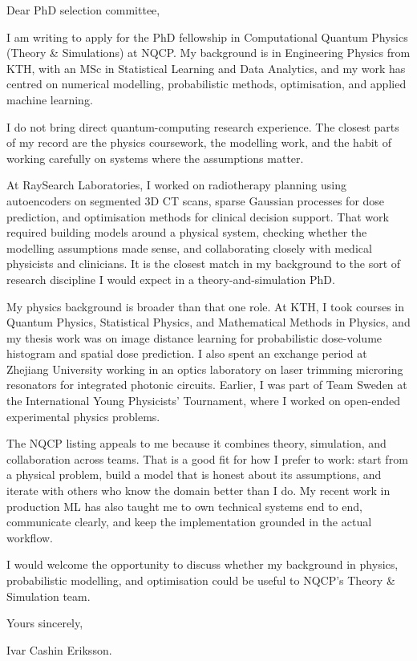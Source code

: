 \documentclass[11pt,a4paper]{moderncv}
\begin{document}
\makecvtitle
Dear PhD selection committee,

\vspace*{2em}
I am writing to apply for the PhD fellowship in Computational Quantum Physics (Theory \& Simulations) at NQCP. My background is in Engineering Physics from KTH, with an MSc in Statistical Learning and Data Analytics, and my work has centred on numerical modelling, probabilistic methods, optimisation, and applied machine learning.

\hspace*{2em}
I do not bring direct quantum-computing research experience. The closest parts of my record are the physics coursework, the modelling work, and the habit of working carefully on systems where the assumptions matter.

\hspace*{2em}
At RaySearch Laboratories, I worked on radiotherapy planning using autoencoders on segmented 3D CT scans, sparse Gaussian processes for dose prediction, and optimisation methods for clinical decision support. That work required building models around a physical system, checking whether the modelling assumptions made sense, and collaborating closely with medical physicists and clinicians. It is the closest match in my background to the sort of research discipline I would expect in a theory-and-simulation PhD.

\hspace*{2em}
My physics background is broader than that one role. At KTH, I took courses in Quantum Physics, Statistical Physics, and Mathematical Methods in Physics, and my thesis work was on image distance learning for probabilistic dose-volume histogram and spatial dose prediction. I also spent an exchange period at Zhejiang University working in an optics laboratory on laser trimming microring resonators for integrated photonic circuits. Earlier, I was part of Team Sweden at the International Young Physicists' Tournament, where I worked on open-ended experimental physics problems.

\hspace*{2em}
The NQCP listing appeals to me because it combines theory, simulation, and collaboration across teams. That is a good fit for how I prefer to work: start from a physical problem, build a model that is honest about its assumptions, and iterate with others who know the domain better than I do. My recent work in production ML has also taught me to own technical systems end to end, communicate clearly, and keep the implementation grounded in the actual workflow.

\hspace*{2em}
I would welcome the opportunity to discuss whether my background in physics, probabilistic modelling, and optimisation could be useful to NQCP's Theory \& Simulation team.

\vspace*{2em}
Yours sincerely,

\vspace*{1em}
Ivar Cashin Eriksson.
\end{document}
